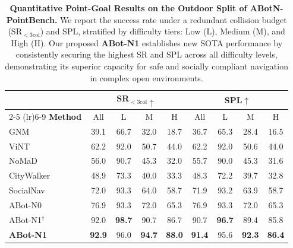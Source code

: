 \begin{table}[t]
\centering
\caption{\textbf{Quantitative Point-Goal Results on the Outdoor Split of ABotN-PointBench.} 
We report the success rate under a redundant collision budget ($\text{SR}_{<3\text{col}}$) and SPL, stratified by difficulty tiers: Low (L), Medium (M), and High (H). 
Our proposed \textbf{ABot-N1} establishes new SOTA performance by consistently securing the highest SR and SPL across all difficulty levels, demonstrating its superior capacity for safe and socially compliant navigation in complex open environments.}



\label{tab:exp-pointgoal-out}
\small
\setlength{\tabcolsep}{6.0pt}
\begin{tabular}{l cccc cccc}
\toprule
 & \multicolumn{4}{c}{\textbf{SR$_{<3\text{col}}\uparrow$}} & \multicolumn{4}{c}{\textbf{SPL$\uparrow$}} \\
\cmidrule(lr){2-5} \cmidrule(lr){6-9}
\textbf{Method} & All & L & M & H & All & L & M & H \\
\midrule
GNM~\cite{shah2023gnm}                & 39.1 & 66.7 & 32.0 & 18.7 & 36.7 & 65.3 & 28.4 & 16.5 \\
ViNT~\cite{shah2023vint}              & 62.2 & 92.0 & 50.7 & 44.0 & 62.2 & 92.0 & 50.6 & 44.0 \\
NoMaD~\cite{sridhar2024nomad}         & 56.0 & 90.7 & 45.3 & 32.0 & 55.7 & 90.0 & 45.3 & 31.6 \\
CityWalker~\cite{liu2025citywalker}   & 48.9 & 73.3 & 40.0 & 33.3 & 48.3 & 72.2 & 39.7 & 32.8 \\
SocialNav~\cite{chen2025socialnav}    & 72.0 & 93.3 & 64.0 & 58.7 & 71.9 & 93.2 & 63.9 & 58.7 \\
ABot-N0~\cite{abotn0}                 & 76.9 & 93.3 & 72.0 & 65.3 & 76.9 & 93.3 & 72.0 & 65.3 \\
\midrule
ABot-N1$^\dagger$                     & 92.0 & \textbf{98.7} & 90.7 & 86.7 & 90.7 & \textbf{96.7} & 89.4 & 85.8 \\
\textbf{ABot-N1}                      & \textbf{92.9} & 96.0 & \textbf{94.7} & \textbf{88.0} & \textbf{91.4} & 95.6 & \textbf{92.3} & \textbf{86.4} \\
\bottomrule
\end{tabular}
\end{table}




